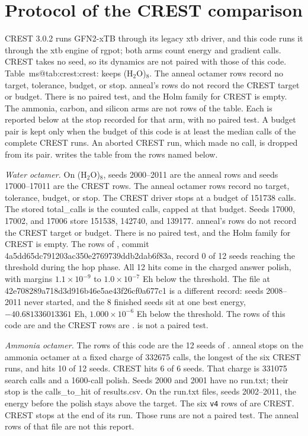 \documentclass[journal=jctcce,manuscript=suppinfo]{achemso}
\makeatletter
\newcommand{\msref}[1]{\csname ms@#1\endcsname\mseqmark#1:\relax}
\def\mseqmark#1#2#3\relax{\ifx#1e\ifx#2q\ of the main text\fi\fi}
\makeatother
\begin{document}
\section{Protocol of the CREST comparison}
\label{sec:si-crest}
CREST 3.0.2 runs GFN2-xTB through its legacy xtb driver, and this code runs
it through the xtb engine of rgpot; both arms count energy and gradient
calls.
CREST takes no seed, so its dynamics are not paired with those of this code.
Table~\msref{tab:crest} keeps (H\(_2\)O)\(_8\).
The anneal octamer rows record no target, tolerance, budget, or stop.
anneal's rows do not record the CREST target or budget.
There is no paired test, and the Holm family for CREST is empty.
The ammonia, carbon, and silicon arms are not rows of the table.
Each is reported below at the stop recorded for that arm, with no paired test.
A budget pair is kept only when the budget of this code is at least the
median calls of the complete CREST runs.
An aborted CREST run, which made no call, is dropped from its pair.
 writes the table from the rows
named below.

\emph{Water octamer.}
On (H\(_2\)O)\(_8\), seeds 2000--2011 are the anneal rows and seeds 17000--17011
are the CREST rows.
The anneal octamer rows record no target, tolerance, budget, or stop.
The CREST driver stops at a budget of 151738 calls.
The stored total\_calls is the counted calls, capped at that budget.
Seeds 17000, 17002, and 17006 store 151538, 142740, and 139177.
anneal's rows do not record the CREST target or budget.
There is no paired test, and the Holm family for CREST is empty.
The rows of , commit 4a5dd65dc791203ac350e2769739ddb2dab6f83a, record 0 of 12 seeds reaching
the threshold during the hop phase.
All 12 hits come in the charged answer polish, with margins
\(1.1\times 10^{-9}\) to \(1.0\times 10^{-7}\) Eh below the threshold.
The file  at 42e708289a718d3d916b46e5ae43f26cf0a677c1 is a different record:
seeds 2008--2011 never started, and the 8 finished seeds sit at one best energy,
\(-40.681336013361\) Eh, \(1.000\times 10^{-6}\) Eh below the threshold.
The rows of this code are 
and the CREST rows are .
 is not a paired test.

\emph{Ammonia octamer.}
The rows of this code are the 12 seeds of
.
anneal stops on the ammonia octamer at a fixed charge of 332675 calls,
the longest of the six CREST runs, and hits 10 of 12 seeds.
CREST hits 6 of 6 seeds.
That charge is 331075 search calls and a 1600-call polish.
Seeds 2000 and 2001 have no run.txt; their stop is the calls\_to\_hit of results.csv.
On the run.txt files, seeds 2002--2011, the energy before the polish stays above the target.
The six \texttt{v4} rows of  are CREST.
CREST stops at the end of its run.
Those runs are not a paired test.
The anneal rows of that file are not this report.
\end{document}
